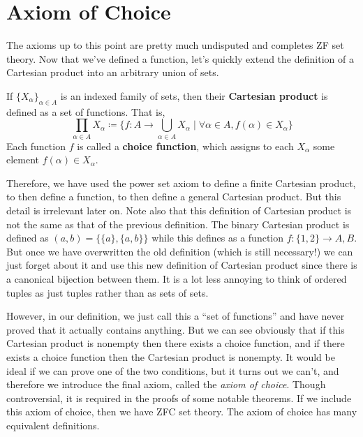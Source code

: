 \section{Axiom of Choice}

  The axioms up to this point are pretty much undisputed and completes ZF set theory. Now that we've defined a function, let's quickly extend the definition of a Cartesian product into an arbitrary union of sets. 
  
  \begin{definition}
    If $\{X_\alpha\}_{\alpha \in A}$ is an indexed family of sets, then their \textbf{Cartesian product} is defined as a set of functions. That is, 
    \begin{equation}
      \prod_{\alpha \in A} X_\alpha \coloneqq \bigg\{ f: A \rightarrow \bigcup_{\alpha \in A} X_\alpha \;\Big|\; \forall \alpha \in A, f(\alpha) \in X_\alpha \bigg\} 
    \end{equation}
    Each function $f$ is called a \textbf{choice function}, which assigns to each $X_\alpha$ some element $f(\alpha) \in X_\alpha$. 
  \end{definition} 

  Therefore, we have used the power set axiom to define a finite Cartesian product, to then define a function, to then define a general Cartesian product. But this detail is irrelevant later on. Note also that this definition of Cartesian product is not the same as that of the previous definition. The binary Cartesian product is defined as $(a, b) = \{\{a\}, \{a, b\}\}$ while this defines as a function $f: \{1, 2\} \rightarrow A, B$. But once we have overwritten the old definition (which is still necessary!) we can just forget about it and use this new definition of Cartesian product since there is a canonical bijection between them. It is a lot less annoying to think of ordered tuples as just tuples rather than as sets of sets. 

  However, in our definition, we just call this a ``set of functions'' and have never proved that it actually contains anything. But we can see obviously that if this Cartesian product is nonempty then there exists a choice function, and if there exists a choice function then the Cartesian product is nonempty. It would be ideal if we can prove one of the two conditions, but it turns out we can't, and therefore we introduce the final axiom, called the \textit{axiom of choice}. Though controversial, it is required in the proofs of some notable theorems. If we include this axiom of choice, then we have ZFC set theory. The axiom of choice has many equivalent definitions. 

